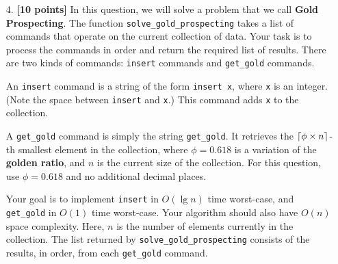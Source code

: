 \documentclass{assignment-263}
\begin{document}
\begin{enumerate}
\program

\item[4.] \textbf{[10 points]}
    In this question, we will solve a problem that we call {\bf Gold Prospecting}.
    The function \verb|solve_gold_prospecting| takes a list of commands that
    operate on the current collection of data.
    Your task is to process the commands in order and return the required list of results.
    There are two kinds of commands: \verb|insert| commands and \verb|get_gold| commands.

    An \verb|insert| command is a string of the form \verb|insert x|,
    where \verb|x| is an integer. (Note the space between \verb|insert| and \verb|x|.)
    This command adds \verb|x| to the collection.

    A \verb|get_gold| command is simply the string \verb|get_gold|.
    It retrieves the $\left \lceil \phi\times n \right \rceil$-th smallest element in the collection, where 
    $\phi=0.618$ is a variation of the \textbf{golden ratio},
    and $n$ is the current size of the collection.
    For this question, use $\phi=0.618$ and no additional decimal places.

    Your goal is to implement \verb|insert| in $O(\lg n)$ time worst-case, and 
    \verb|get_gold| in $O(1)$ time worst-case.
    Your algorithm should also have $O(n)$ space complexity.
    Here, $n$ is the number of elements currently in the collection.
    The list returned by \verb|solve_gold_prospecting| consists of the results, in order,
    from each \verb|get_gold| command.


\end{enumerate}
\end{document}
